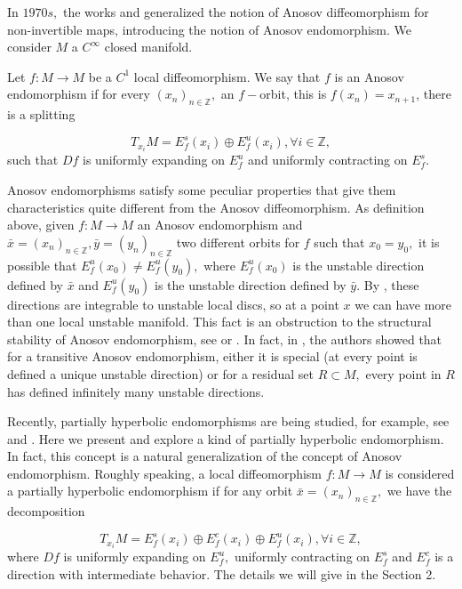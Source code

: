\documentclass[12pt,reqno]{amsart}
\numberwithin{equation}{section}
\theoremstyle{plain}
\theoremstyle{remark}
\begin{document}
In $1970s,$ the works \cite{PRZ} and \cite{MP75}  generalized the notion of Anosov diffeomorphism for non-invertible maps, introducing the notion of Anosov endomorphism. We consider $M$ a $C^{\infty}$ closed manifold. %

Let $f: M \rightarrow M$ be a  $C^1$ local diffeomorphism. We say that $f$ is an Anosov endomorphism if for every $(x_n)_{n \in \mathbb{Z}},$ an $f-$orbit, this is $f(x_n)=x_{n+1}$,  there is a splitting

$$T_{x_i} M = E^s_f(x_i) \oplus E^u_f(x_i), \forall i \in \mathbb{Z},$$
such that $Df$ is uniformly expanding on $E^u_f$ and uniformly contracting on $E^s_f.$


Anosov endomorphisms satisfy some peculiar properties that give them characteristics quite different from the Anosov diffeomorphism. As  definition above, given $f: M \rightarrow M$ an Anosov endomorphism and $ \bar{x} = (x_n)_{n \in \mathbb{Z}}, \bar{y} = (y_n)_{n \in \mathbb{Z}} $ two different orbits for $f$ such that $x_0 = y_0,$ it is possible that $E^u_f(x_0) \neq E^u_f(y_0),$ where $E^u_f(x_0)$ is the unstable direction defined by $\bar{x} $ and $E^u_f(y_0)$ is the unstable direction defined by $\bar{y}.$ By \cite{PRZ}, these directions are integrable to unstable local discs, so at a point $x$ we can have more than one local unstable manifold. This fact is an obstruction to the structural stability of Anosov endomorphism, see \cite{PRZ} or \cite{MP75}.  In fact, in \cite{MT16}, the authors showed that for a transitive Anosov endomorphism, either it is special (at every point is defined a unique unstable direction) or for a residual set $R \subset M,$ every point in $R$ has defined infinitely many unstable directions.

Recently, partially hyperbolic endomorphisms are being studied, for example, see \cite{HH21} and \cite{HE19}. Here we present and explore a kind of partially hyperbolic
endomorphism. In fact, this concept is a natural generalization of the concept of Anosov endomorphism. Roughly speaking, a local diffeomorphism $f: M \rightarrow M$ is considered a partially hyperbolic endomorphism if for any orbit $\bar{x} = (x_n)_{n \in \mathbb{Z}},$ we have the decomposition

$$T_{x_i} M = E^s_f(x_i) \oplus E^c_f(x_i) \oplus  E^u_f(x_i), \forall i \in \mathbb{Z},$$
where $Df$ is uniformly expanding on $E^u_f,$ uniformly contracting on $E^s_f$ and $E^c_f$ is a direction with intermediate behavior. The details we will give in the
Section 2.
\end{document}
